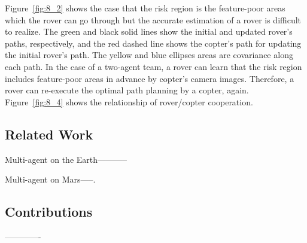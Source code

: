 \documentclass[conference]{IEEEtran}
\begin{document}
Figure~\ref{fig:8_2} shows the case that the risk region is the feature-poor areas which the rover can go through but the accurate estimation of a rover is difficult to realize. The green and black solid lines show the initial and updated rover’s paths, respectively, and the red dashed line shows the copter’s path for updating the initial rover’s path. The yellow and blue ellipses areas are covariance along each path. In the case of a two-agent team, a rover can learn that the risk region includes feature-poor areas in advance by copter’s camera images. Therefore, a rover can re-execute the optimal path planning by a copter, again.
Figure~\ref{fig:8_4} shows the relationship of rover/copter cooperation.

\subsection*{Related Work}
Multi-agent on the Earth-----------

Multi-agent on Mars-----.

\subsection*{Contributions}
-------------
\end{document}
